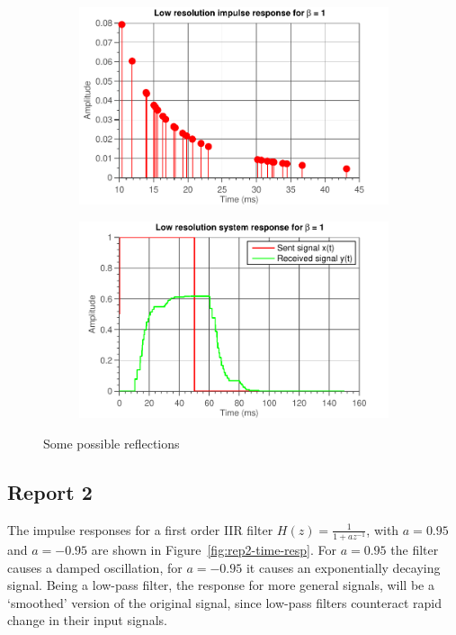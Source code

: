 \documentclass[11pt,titlepage]{report}
\begin{document}
\begin{figure}[H]
	\centering
	\begin{subfigure}{0.49\textwidth}
		\includegraphics[width=\textwidth]{../../deliverable-7-resources/figures/ass-1/report-1/ass-1-report-1-impulse-response-2-copies-beta-1.pdf}
	\end{subfigure}
	\begin{subfigure}{0.49\textwidth}
		\includegraphics[width=\textwidth]{../../deliverable-7-resources/figures/ass-1/report-1/ass-1-report-1-system-response-2-copies-beta-1.pdf}
	\end{subfigure}
	\caption{Some possible reflections}
	\label{fig:rep1-reflections-matlab}
\end{figure}

\subsection{Report 2}
The impulse responses for a first order IIR filter $H(z) = \frac{1}{1+az^{-1}}$, with $a=0.95$ and $a=-0.95$ are shown in Figure~\ref{fig:rep2-time-resp}. For $a=0.95$ the filter causes a damped oscillation, for $a=-0.95$ it causes an exponentially decaying signal. Being a low-pass filter, the response for more general signals, will be a `smoothed' version of the original signal, since low-pass filters counteract rapid change in their input signals. %
\end{document}
